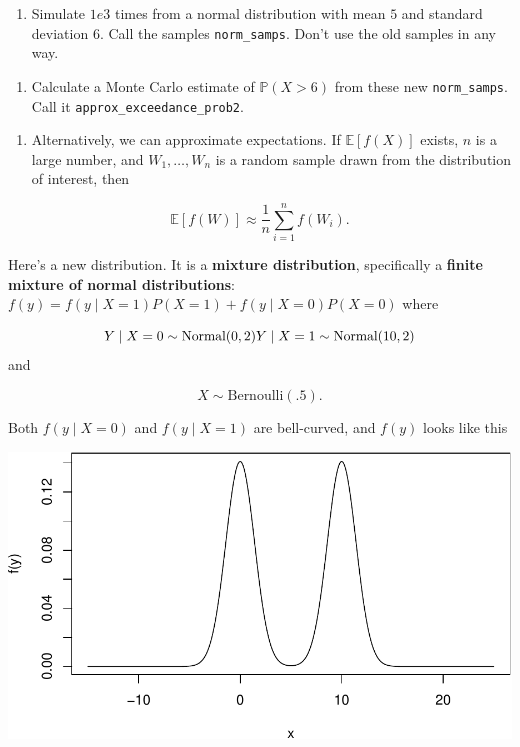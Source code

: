 \documentclass[
  12pt,
  krantz2]{krantz}
\providecommand{\tightlist}{%
  \setlength{\itemsep}{0pt}\setlength{\parskip}{0pt}}
\begin{document}
\begin{enumerate}
\def\labelenumi{\arabic{enumi}.}
\setcounter{enumi}{3}
\tightlist
\item
  Simulate \(1e3\) times from a normal distribution with mean \(5\) and standard deviation \(6\). Call the samples \texttt{norm\_samps}. Don't use the old samples in any way.
\end{enumerate}

\begin{enumerate}
\def\labelenumi{\alph{enumi}.}
\setcounter{enumi}{3}
\tightlist
\item
  Calculate a Monte Carlo estimate of \(\mathbb{P}(X > 6)\) from these new \texttt{norm\_samps}. Call it \texttt{approx\_exceedance\_prob2}.
\end{enumerate}

\begin{enumerate}
\def\labelenumi{\arabic{enumi}.}
\setcounter{enumi}{3}
\tightlist
\item
  Alternatively, we can approximate expectations. If \(\mathbb{E}[f(X)]\) exists, \(n\) is a large number, and \(W_1, \ldots, W_n\) is a random sample drawn from the distribution of interest, then
\end{enumerate}

\[
\mathbb{E}[f(W)] \approx \frac{1}{n}\sum_{i=1}^n f(W_i).
\]

Here's a new distribution. It is a \textbf{mixture distribution}, specifically a \textbf{finite mixture of normal distributions}: \(f(y) = f(y \mid X=1)P(X=1) + f(y \mid X=0)P(X=0)\) where

\[
Y \mid X=0 \sim \text{Normal}(0, 2) \\
Y \mid X=1 \sim \text{Normal}(10, 2)
\]
and

\[
X \sim \text{Bernoulli}(.5).
\]

Both \(f(y \mid X=0)\) and \(f(y \mid X=1)\) are bell-curved, and \(f(y)\) looks like this

\begin{center}\includegraphics[width=0.5\linewidth]{r_and_python_book_files/figure-latex/unnamed-chunk-48-1} \end{center}
\end{document}
